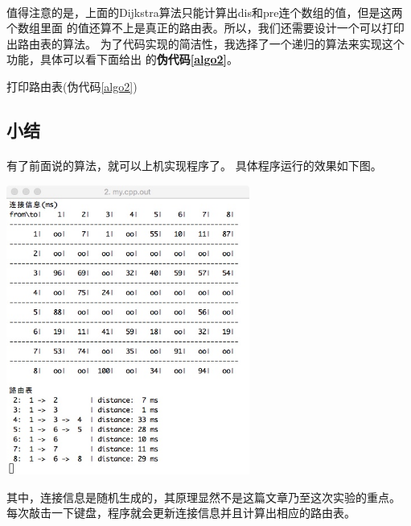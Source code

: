\documentclass{article}
\begin{document}
		\paragraph{}
			值得注意的是，上面的Dijkstra算法只能计算出dis和pre连个数组的值，但是这两个数组里面
			的值还算不上是真正的路由表。所以，我们还需要设计一个可以打印出路由表的算法。
			为了代码实现的简洁性，我选择了一个递归的算法来实现这个功能，具体可以看下面给出
			的\textbf{伪代码\ref{algo2}}。
			\begin{algorithm}[!h]
				\caption{打印路由表(伪代码\ref{algo2})}
				\begin{algorithmic}[1]
						\EndIf
					\EndFunction
						\EndFor
					\EndFunction
				\end{algorithmic}
				\label{algo2}
			\end{algorithm}
	\subsection{小结}
		\paragraph{}
			有了前面说的算法，就可以上机实现程序了。
			具体程序运行的效果如下图。
			\begin{center}
			\includegraphics[width = 8cm]{runtime.jpeg}\\
			\end{center}
			其中，连接信息是随机生成的，其原理显然不是这篇文章乃至这次实验的重点。
			每次敲击一下键盘，程序就会更新连接信息并且计算出相应的路由表。
\end{document}
